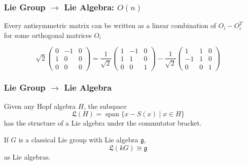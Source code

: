 \documentclass{beamer}
\begin{document}
\begin{frame}
\frametitle{Lie Group $\to$ Lie Algebra: $O(n)$}

\begin{lemma}{}
Every antisymmetric matrix can be written as a linear combination of $O_i - O_i^T$ for some orthogonal matrices $O_i$
\end{lemma}





\begin{equation*}
\sqrt{2} \begin{pmatrix}
0 & -1 & 0 \\
1 & 0 & 0 \\
0 & 0 & 0
\end{pmatrix} = \dfrac{1}{\sqrt{2}} \begin{pmatrix}
1 & -1 & 0 \\
1 & 1 & 0 \\
0 & 0 & 1
\end{pmatrix} - \dfrac{1}{\sqrt{2}} \begin{pmatrix}
1 & 1 & 0 \\
-1 & 1 & 0 \\
0 & 0 & 1
\end{pmatrix}
\end{equation*}





%


\end{frame}


\begin{frame}
\frametitle{Lie Group $\to$ Lie Algebra}

Given any Hopf algebra $H$, the subspace
\begin{equation*}
\mathfrak{L}(H) = \operatorname{span}\{ x - S(x) \mid x \in H \}
\end{equation*}
has the structure of a Lie algebra under the commutator bracket.


\begin{prop*}{}{}
If $G$ is a classical Lie group with Lie algebra $\mathfrak{g}$,
\begin{equation*}
\mathfrak{L}(kG) \cong \mathfrak{g}
\end{equation*}
as Lie algebras.
\end{prop*}


\end{frame}
\end{document}
